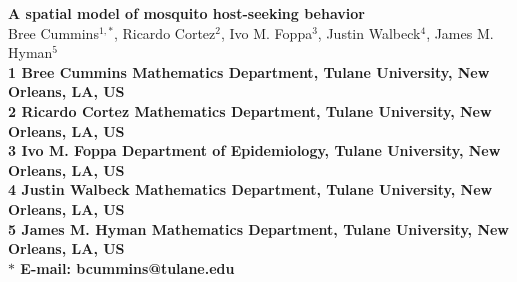 \documentclass[10pt]{article}
\date{}
\begin{document}
\begin{flushleft}
{\Large
\textbf{A spatial model of mosquito host-seeking behavior}
}
\\
Bree Cummins$^{1,\ast}$,
Ricardo Cortez$^{2}$,
Ivo M. Foppa$^{3}$,
Justin Walbeck$^{4}$,
James M. Hyman$^{5}$
\\
\bf{1} Bree Cummins Mathematics Department, Tulane University, New Orleans, LA, US
\\
\bf{2} Ricardo Cortez Mathematics Department, Tulane University, New Orleans, LA, US
\\
\bf{3} Ivo M. Foppa Department of Epidemiology, Tulane University, New Orleans, LA, US
\\
\bf{4} Justin Walbeck Mathematics Department, Tulane University, New Orleans, LA, US
\\
\bf{5} James M. Hyman Mathematics Department, Tulane University, New Orleans, LA, US
\\
$\ast$ E-mail: bcummins@tulane.edu
\end{flushleft}


\end{document}
